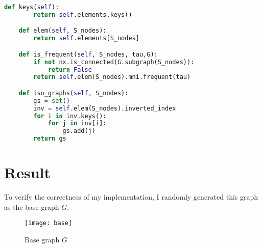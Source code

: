 \documentclass[a4paper, 12pt]{report}
\begin{document}
\begin{lstlisting}[language=python, frame=single]
    def keys(self):
        return self.elements.keys()

    def elem(self, S_nodes):
        return self.elements[S_nodes]

    def is_frequent(self, S_nodes, tau,G):
        if not nx.is_connected(G.subgraph(S_nodes)):
            return False
        return self.elem(S_nodes).mni.frequent(tau)

    def iso_graphs(self, S_nodes):
        gs = set()
        inv = self.elem(S_nodes).inverted_index
        for i in inv.keys():
            for j in inv[i]:
                gs.add(j)
        return gs
\end{lstlisting}

\chapter{Result}
To verify the correctness of my implementation, I randomly generated this graph as the base graph $G$.
\begin{figure}[H]
\centering
\texttt{[image: base]}
\caption{Base graph $G$}
\end{figure}
\end{document}
